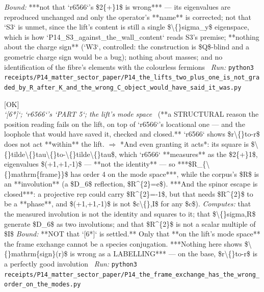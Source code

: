 \begin{description}
 \emph{Bound:}  ***not that `r6566`'s \$2\{+\}1\$ is wrong*** --- its eigenvalues are reproduced unchanged and only the operator's **name** is corrected; not that `S3` is unmet, since the lift's content is still a single \$\textbackslash\{\}sigma\_y\$ eigenspace, which is how `P14\_S3\_against\_the\_wall\_content` reads S3's premise; **nothing about the charge sign** (`W3`, controlled: the construction is \$Q\$-blind and a geometric charge sign would be a bug); nothing about masses; and no identification of the fibre's elements with the colourless fermions
\ \emph{Run:} \texttt{python3 receipts/P14\_matter\_sector\_paper/P14\_the\_lifts\_two\_plus\_one\_is\_not\_graded\_by\_R\_after\_K\_and\_the\_wrong\_C\_object\_would\_have\_said\_it\_was.py}
\item[\rcptlabel{P14_the_frame_exchange_has_the_wrong_order_on_the_modes}{P14R73}\textbf{P14R73}\quad\texttt{P14\_the\_frame\_exchange\_has\_the\_wrong\_order\_on\_the\_modes}]\hfill\textsf{[OK]}\\
\textit{`[6*]`; `r6566`'s `PART 5`; the lift's mode space} \ (**a STRUCTURAL reason the position reading fails on the lift, on top of `r6566`'s locational one --- and the loophole that would have saved it, checked and closed.** `r6566` shows \$r\textbackslash\{\}to-r\$ does not act **within** the lift. \ensuremath{\Rightarrow} *And even granting it acts*: its square is \$\textbackslash\{\}tilde\textbackslash\{\}tau\textbackslash\{\}to-\textbackslash\{\}tilde\textbackslash\{\}tau\$, which `r6566` **measures** as the \$2\{+\}1\$, eigenvalues \$(+1,+1,-1)\$ --- **not the identity** --- so ***\$R\_\{\textbackslash\{\}mathrm\{frame\}\}\$ has order 4 on the mode space***, while the corpus's \$R\$ is an **involution** (a \$D\_6\$ reflection, \$R\textasciicircum{}\{2\}=e\$).  ***And the spinor escape is closed***: a projective rep could carry \$R\textasciicircum{}\{2\}=-1\$, but that needs \$R\textasciicircum{}\{2\}\$ to be a **phase**, and \$(+1,+1,-1)\$ is not \$c\textbackslash\{\},I\$ for any \$c\$). 
\emph{Computes:} that the measured involution is not the identity and squares to it; that \$\textbackslash\{\}sigma,R\$ generate \$D\_6\$ as two involutions; and that \$R\textasciicircum{}\{2\}\$ is not a scalar multiple of \$I\$
 \emph{Bound:}  **NOT that `[6*]` is settled.** Only that **on the lift's mode space** the frame exchange cannot be a species conjugation. ***Nothing here shows \$\textbackslash\{\}mathrm\{sign\}(r)\$ is wrong as a LABELLING*** --- on the base, \$r\textbackslash\{\}to-r\$ is a perfectly good involution
\ \emph{Run:} \texttt{python3 receipts/P14\_matter\_sector\_paper/P14\_the\_frame\_exchange\_has\_the\_wrong\_order\_on\_the\_modes.py}

\end{description}
